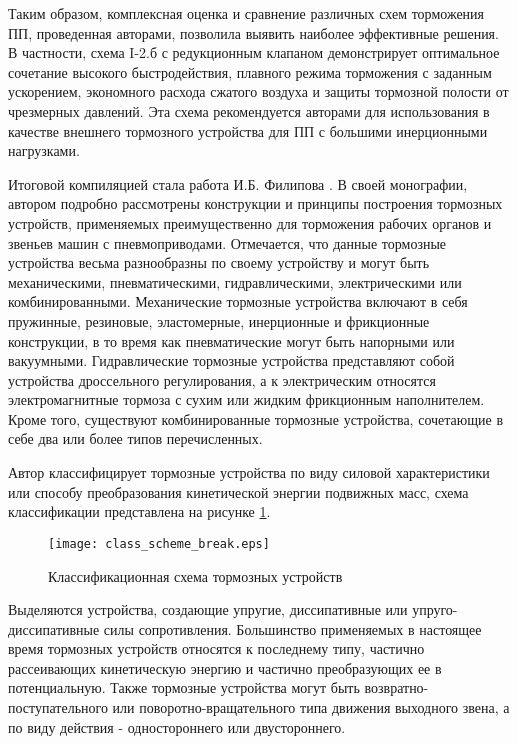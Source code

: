 Таким образом, комплексная оценка и сравнение различных схем торможения ПП, проведенная авторами, позволила
выявить наиболее эффективные решения. В частности, схема I-2.б с редукционным клапаном демонстрирует оптимальное
сочетание высокого быстродействия, плавного режима торможения с заданным ускорением, экономного расхода сжатого
воздуха и защиты тормозной полости от чрезмерных давлений. Эта схема рекомендуется авторами для использования в качестве
внешнего тормозного устройства для ПП с большими инерционными нагрузками.

Итоговой компиляцией стала работа И.Б. Филипова \cite*{филипов:тормозные_устройства}. В своей монографии, автором подробно рассмотрены конструкции и
принципы построения тормозных устройств, применяемых преимущественно для торможения рабочих органов и звеньев машин
с пневмоприводами. Отмечается, что данные тормозные устройства весьма разнообразны по своему устройству и могут быть
механическими, пневматическими, гидравлическими, электрическими или комбинированными. Механические тормозные устройства
включают в себя пружинные, резиновые, эластомерные, инерционные и фрикционные конструкции, в то время как пневматические
могут быть напорными или вакуумными. Гидравлические тормозные устройства представляют собой устройства дроссельного
регулирования, а к электрическим относятся электромагнитные тормоза с сухим или жидким фрикционным наполнителем.
Кроме того, существуют комбинированные тормозные устройства, сочетающие в себе два или более типов перечисленных.

Автор классифицирует тормозные устройства по виду силовой характеристики или способу
преобразования кинетической энергии подвижных масс, схема классификации представлена на рисунке \cref*{fig:класс_схема_тормозных_устройств}.


\begin{figure}[h]
    \centerfloat
    \texttt{[image: class\_scheme\_break.eps]}
    \caption{Классификационная схема тормозных устройств}\label{fig:класс_схема_тормозных_устройств}
\end{figure}


Выделяются устройства, создающие упругие,
диссипативные или упруго-диссипативные силы сопротивления. Большинство применяемых в настоящее
время тормозных устройств относятся к последнему типу, частично рассеивающих кинетическую энергию и
частично преобразующих ее в потенциальную. Также тормозные устройства могут быть возвратно-поступательного
или поворотно-вращательного типа движения выходного звена, а по виду действия - одностороннего или двустороннего.

